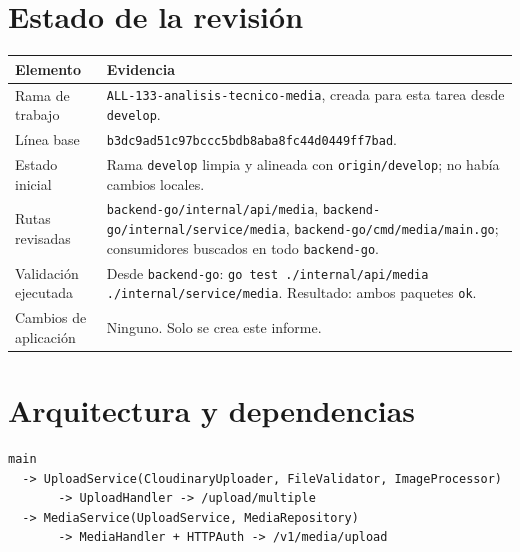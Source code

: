 \documentclass[11pt,a4paper]{article}
\begin{document}
\section{Estado de la revisión}
\begin{longtable}{>{\raggedright\arraybackslash}p{}>{\raggedright\arraybackslash}p{}}
\toprule
Elemento & Evidencia\\ \midrule
Rama de trabajo & \nolinkurl{ALL-133-analisis-tecnico-media}, creada para esta tarea desde \nolinkurl{develop}.\\
Línea base & \nolinkurl{b3dc9ad51c97bccc5bdb8aba8fc44d0449ff7bad}.\\
Estado inicial & Rama \nolinkurl{develop} limpia y alineada con \nolinkurl{origin/develop}; no había cambios locales.\\
Rutas revisadas & \nolinkurl{backend-go/internal/api/media}, \nolinkurl{backend-go/internal/service/media}, \nolinkurl{backend-go/cmd/media/main.go}; consumidores buscados en todo \nolinkurl{backend-go}.\\
Validación ejecutada & Desde \nolinkurl{backend-go}: \nolinkurl{go test ./internal/api/media ./internal/service/media}. Resultado: ambos paquetes \nolinkurl{ok}.\\
Cambios de aplicación & Ninguno. Solo se crea este informe.\\
\bottomrule
\end{longtable}

\section{Arquitectura y dependencias}
\begin{lstlisting}
main
  -> UploadService(CloudinaryUploader, FileValidator, ImageProcessor)
       -> UploadHandler -> /upload/multiple
  -> MediaService(UploadService, MediaRepository)
       -> MediaHandler + HTTPAuth -> /v1/media/upload
\end{lstlisting}
\end{document}
